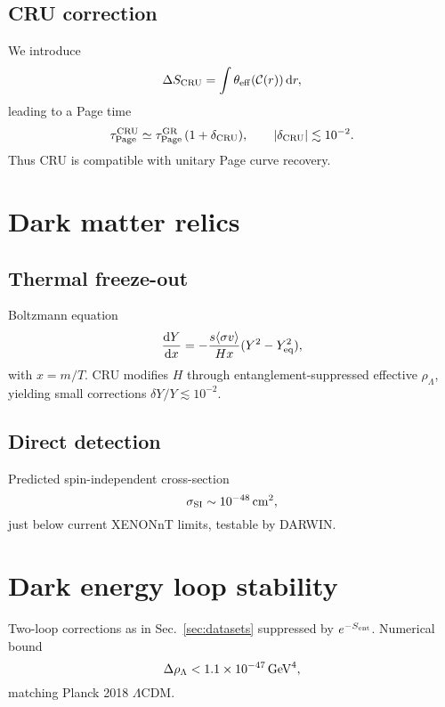 \documentclass[%
 reprint,
 amsmath,amssymb,
 aps,
 pra,
 longbibliography,
 nofootinbib
]{revtex4-2}
\newcommand{\dd}{\mathrm{d}}
\begin{document}
\subsection{CRU correction}
We introduce
\begin{equation}
\Delta S_{\rm CRU}=\int \theta_{\rm eff}(\mathcal{C}(r))\,\dd r,
\end{equation}
leading to a Page time
\begin{equation}
\tau_{\rm Page}^{\rm CRU}\simeq \tau_{\rm Page}^{\rm GR}\,(1+\delta_{\rm CRU}),
\qquad |\delta_{\rm CRU}|\lesssim 10^{-2}.
\end{equation}
Thus CRU is compatible with unitary Page curve recovery.

\section{Dark matter relics}
\label{sec:dm}

\subsection{Thermal freeze-out}
Boltzmann equation
\begin{equation}
\frac{\dd Y}{\dd x}=-\frac{s\langle\sigma v\rangle}{Hx}(Y^2-Y_{\rm eq}^2),
\end{equation}
with $x=m/T$.  
CRU modifies $H$ through entanglement-suppressed effective $\rho_\Lambda$,
yielding small corrections $\delta Y/Y\lesssim10^{-2}$.

\subsection{Direct detection}
Predicted spin-independent cross-section
\begin{equation}
\sigma_{\rm SI}\sim 10^{-48}\,{\rm cm}^2,
\end{equation}
just below current XENONnT limits, testable by DARWIN.

\section{Dark energy loop stability}
\label{sec:de}

Two-loop corrections as in Sec.~\ref{sec:datasets} suppressed by $e^{-S_{\rm ent}}$.  
Numerical bound
\begin{equation}
\Delta\rho_\Lambda<1.1\times10^{-47}\,{\rm GeV}^4,
\end{equation}
matching Planck 2018 $\Lambda$CDM.
\end{document}
